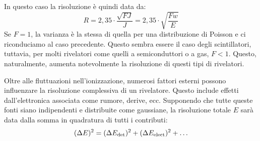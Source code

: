 In questo caso la risoluzione è quindi data da:
\begin{equation*}
   R
   =2,35 \cdot \frac{\sqrt{FJ}}{J}
   =2,35 \cdot \sqrt{\frac{Fw}{E}}
\end{equation*}
Se $F=1$, la varianza è la stessa di quella per una distribuzione di Poisson e ci riconduciamo al caso precedente. Questo sembra essere il caso degli scintillatori, tuttavia, per molti rivelatori come quelli a semiconduttori o a gas, $F<1$. Questo, naturalmente, aumenta notevolmente la risoluzione di questi tipi di rivelatori.

\vspace{0.2cm}Oltre alle fluttuazioni nell'ionizzazione, numerosi fattori esterni possono influenzare la risoluzione complessiva di un rivelatore. Questo include effetti dall'elettronica associata come rumore, derive, ecc. Supponendo che tutte queste fonti siano indipendenti e distribuite come gaussiane, la risoluzione totale $E$ sarà data dalla somma in quadratura di tutti i contributi:
\begin{equation*}
   (\Delta E)^2
   =(\Delta E_{\rm det})^2 + (\Delta E_{\rm elect})^2 + \ldots
\end{equation*}

